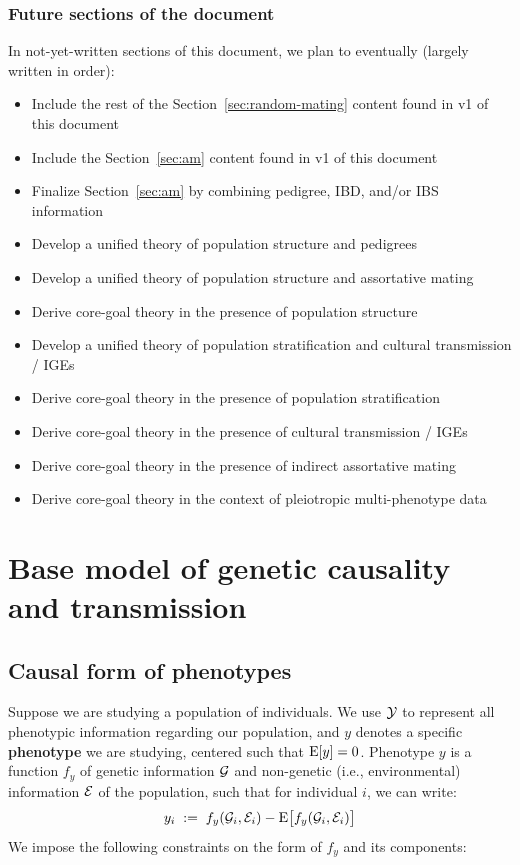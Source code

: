 \documentclass[12pt]{article}
\numberwithin{equation}{section}
\begin{document}
\subsubsection{Future sections of the document}
In not-yet-written sections of this document, we plan to eventually (largely written in order):
\begin{itemize}
    \item Include the rest of the Section~\ref{sec:random-mating} content found in v1 of this document
    \item Include the Section~\ref{sec:am} content found in v1 of this document
    \item Finalize Section~\ref{sec:am} by combining pedigree, IBD, and/or IBS information
    \item Develop a unified theory of population structure and pedigrees
    \item Develop a unified theory of population structure and assortative mating 
    \item Derive core-goal theory in the presence of population structure
    \item Develop a unified theory of population stratification and cultural transmission / IGEs
    \item Derive core-goal theory in the presence of population stratification
    \item Derive core-goal theory in the presence of cultural transmission / IGEs
    \item Derive core-goal theory in the presence of indirect assortative mating
    \item Derive core-goal theory in the context of pleiotropic multi-phenotype data
\end{itemize}

\section{Base model of genetic causality and transmission}\label{sec:base-model}

\subsection{Causal form of phenotypes}\label{sec:pheno-form}
Suppose we are studying a population of individuals.
We use $\mathcal{Y}$ to represent all phenotypic information regarding our population, and $y$ denotes a specific \textbf{phenotype} we are studying, centered such that $\mathrm{E}[y] = 0$.
Phenotype $y$ is a function $f_y$ of genetic information $\mathcal{G}$ and non-genetic (i.e., environmental) information $\mathcal{E}$ of the population, such that for individual $i$, we can write:
\begin{equation}\label{eq:pheno-function}
    y_i \;:=\; f_y(\mathcal{G}_i, \mathcal{E}_i) - \mathrm{E}\big[f_y(\mathcal{G}_i, \mathcal{E}_i)\big]
\end{equation}
We impose the following constraints on the form of $f_y$ and its components:
\end{document}
